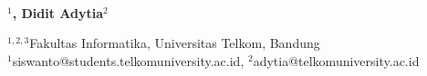  
  \begin{center}
      \textbf{\large \Title}\\
      \bigskip 
  \end{center}
  
  
  
   \begin{center}
     \bf \Author$^1$, Didit Adytia$^2$
  \end{center}
  
   \begin{center}
     $^{1,2,3}$Fakultas Informatika, Universitas Telkom, Bandung\\
$^1$siswanto@students.telkomuniversity.ac.id, $^2$adytia@telkomuniversity.ac.id
  \end{center}
  
   
   
